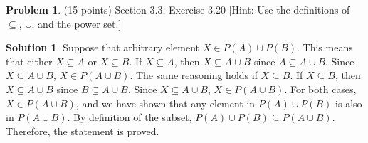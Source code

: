 \documentclass{article}
\theoremstyle{definition}
\newtheorem{problem}{Problem}
\newtheorem*{solution}{Solution}
\begin{document}
\newpage
\begin{problem} (15 points) Section 3.3, Exercise 3.20 
[Hint: Use the definitions of $\subseteq$, $\cup$, and the power set.]
\end{problem}
\begin{solution}
Suppose that arbitrary element $X \in P(A) \cup P(B)$. 
This means that either $X \subseteq A$ or $X \subseteq B$.
If $X \subseteq A$, then $X \subseteq A \cup B$ since $A \subseteq A \cup B$.
Since $X \subseteq A \cup B$, $X \in P(A \cup B)$.
The same reasoning holds if $X \subseteq B$.
If $X \subseteq B$, then $X \subseteq A \cup B$ since $B \subseteq A \cup B$.
Since $X \subseteq A \cup B$, $X \in P(A \cup B)$.
For both cases, $X \in P(A \cup B)$, and we have shown that any element in $P(A) \cup P(B)$ is also in $P(A \cup B)$.
By definition of the subset, $P(A) \cup P(B) \subseteq P(A \cup B)$.
Therefore, the statement is proved.
\end{solution}
\end{document}
